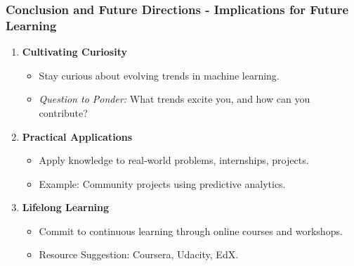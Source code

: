 \documentclass[aspectratio=169]{beamer}
\begin{document}
\begin{frame}[fragile]
    \frametitle{Conclusion and Future Directions - Implications for Future Learning}
    \begin{enumerate}
        \item \textbf{Cultivating Curiosity}
            \begin{itemize}
                \item Stay curious about evolving trends in machine learning.
                \item \textit{Question to Ponder:} What trends excite you, and how can you contribute?
            \end{itemize}
        \item \textbf{Practical Applications}
            \begin{itemize}
                \item Apply knowledge to real-world problems, internships, projects.
                \item Example: Community projects using predictive analytics.
            \end{itemize}
        \item \textbf{Lifelong Learning}
            \begin{itemize}
                \item Commit to continuous learning through online courses and workshops.
                \item Resource Suggestion: Coursera, Udacity, EdX.
            \end{itemize}
    \end{enumerate}
\end{frame}
\end{document}
